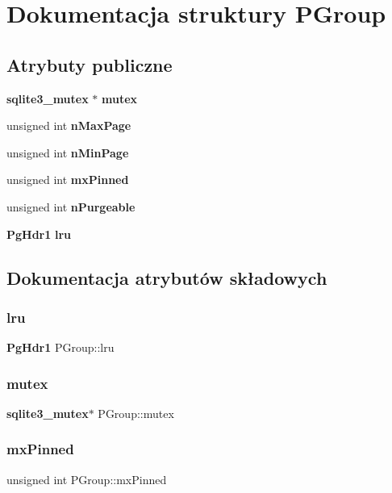 \section{Dokumentacja struktury P\+Group}
\label{struct_p_group}
\subsection*{Atrybuty publiczne}
\begin{DoxyCompactItemize}
\item 
\textbf{ sqlite3\+\_\+mutex} $\ast$ \textbf{ mutex}
\item 
unsigned int \textbf{ n\+Max\+Page}
\item 
unsigned int \textbf{ n\+Min\+Page}
\item 
unsigned int \textbf{ mx\+Pinned}
\item 
unsigned int \textbf{ n\+Purgeable}
\item 
\textbf{ Pg\+Hdr1} \textbf{ lru}
\end{DoxyCompactItemize}


\subsection{Dokumentacja atrybutów składowych}
\mbox{\label{struct_p_group_a73c1201996cb4750677fdf1d73f50a92}} 
\subsubsection{lru}
{\footnotesize\ttfamily \textbf{ Pg\+Hdr1} P\+Group\+::lru}

\mbox{\label{struct_p_group_a7173aa723aa61d6b1f79cde2f7d0f74d}} 
\subsubsection{mutex}
{\footnotesize\ttfamily \textbf{ sqlite3\+\_\+mutex}$\ast$ P\+Group\+::mutex}

\mbox{\label{struct_p_group_ac7cdffac1c20d260e8230dba4ab05cea}} 
\subsubsection{mxPinned}
{\footnotesize\ttfamily unsigned int P\+Group\+::mx\+Pinned}

